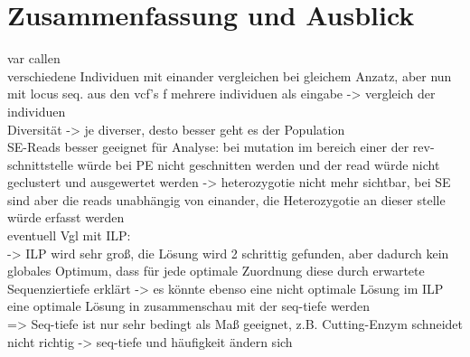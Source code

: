 \chapter{Zusammenfassung und Ausblick} \label{sec:}
var callen\\
verschiedene Individuen mit einander vergleichen bei gleichem Anzatz, aber nun mit locus seq. aus den vcf's f mehrere individuen als eingabe -> vergleich der individuen \\
Diversität -> je diverser, desto besser geht es der Population\\
SE-Reads besser geeignet für Analyse: bei mutation im bereich einer der rev-schnittstelle  würde bei PE nicht geschnitten werden und der read würde nicht geclustert und ausgewertet werden -> heterozygotie nicht mehr sichtbar, bei SE sind aber die reads unabhängig von einander, die Heterozygotie an dieser stelle würde erfasst werden\\
eventuell Vgl mit ILP:\\
-> ILP wird sehr groß, die Lösung wird 2 schrittig gefunden, aber dadurch kein globales Optimum, dass für jede optimale Zuordnung diese durch erwartete Sequenziertiefe erklärt -> es könnte ebenso eine nicht optimale Lösung im ILP eine optimale Lösung in zusammenschau mit der seq-tiefe werden \\
=> Seq-tiefe ist nur sehr bedingt als Maß geeignet, z.B. Cutting-Enzym schneidet nicht richtig -> seq-tiefe und häufigkeit ändern sich\\
\section{} \label{sec:}
\subsection{} \label{subsec:}